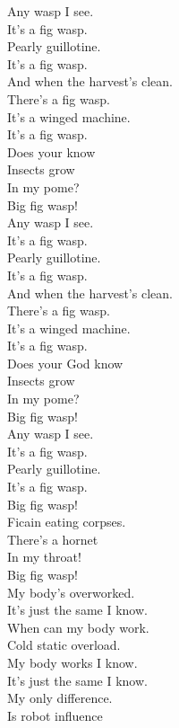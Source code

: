Any wasp I see. \\
It's a fig wasp. \\
Pearly guillotine. \\
It's a fig wasp. \\
And when the harvest's clean. \\
There's a fig wasp. \\
It's a winged machine. \\
It's a fig wasp. \\

Does your  know \\
Insects grow \\
In my pome? \\

Big fig wasp! \\

Any wasp I see. \\
It's a fig wasp. \\
Pearly guillotine. \\
It's a fig wasp. \\
And when the harvest's clean. \\
There's a fig wasp. \\
It's a winged machine. \\
It's a fig wasp. \\

Does your God know \\
Insects grow \\
In my pome? \\

Big fig wasp! \\

Any wasp I see. \\
It's a fig wasp. \\
Pearly guillotine. \\
It's a fig wasp. \\

Big fig wasp! \\

Ficain eating corpses. \\
There's a hornet \\
In my throat! \\

Big fig wasp! \\

My body's overworked. \\
It's just the same I know. \\
When can my body work. \\
Cold static overload. \\
My body works I know. \\
It's just the same I know. \\
My only difference. \\
Is robot influence

